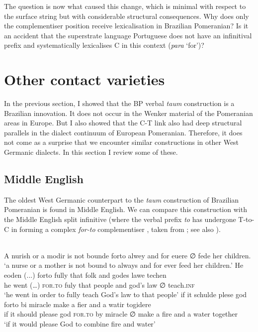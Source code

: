 \documentclass[output=paper,hidelinks,draftmode]{langscibook}
\begin{document}
The question is now what caused this change, which is minimal with respect to the surface string but with considerable structural consequences. Why does only the complementiser position receive lexicalisation in Brazilian Pomeranian? Is it an accident that the superstrate language Portuguese does not have an infinitival prefix and systematically lexicalises C in this context (\textit{para} `for')? 

\section{Other contact varieties}


In the previous section, I showed that the BP verbal \textit{taum} construction is a Brazilian innovation. It does not occur in the Wenker material of the Pomeranian areas in Europe. But I also showed that the C-T link also had deep structural parallels in the dialect continuum of European Pomeranian. Therefore, it does not come as a surprise that we encounter similar constructions in other West Germanic dialects. In this section I review some of these. 

\subsection{Middle English}\label{ME}

The oldest West Germanic counterpart to the \textit{taum} construction of Brazilian Pomeranian is found in Middle English. We can compare this construction with the Middle English split infinitive (where the verbal prefix \textit{to} has undergone T-to-C in forming a complex \textit{for-to} complementiser , taken from \citet[par. 982]{Visser1963}; see also \citet{Mustanoia1960}).


\ea \label{ex:postma:8}
\\
\ea A nurish or a modir is not bounde forto alwey and for euere ∅ fede her children.\\
`a nurse or a mother is not bound to always and for ever feed her children.'
\ex \gll He eoden (...) forto fully that folk and godes lawe {} techen\\
     he went (…) \textsc{for.to} fuly that people and god's law ∅ teach.\textsc{inf}\\
\glt {}`he went in order to fully teach God's law to that people'
\ex\gll if it schulde plese god forto bi miracle {} make a fier and a watir togidere\\
     if it should please god \textsc{for.to} by miracle ∅ make a fire and a water together\\
\glt {}`if it would please God to combine fire and water'\z\z
\end{document}
